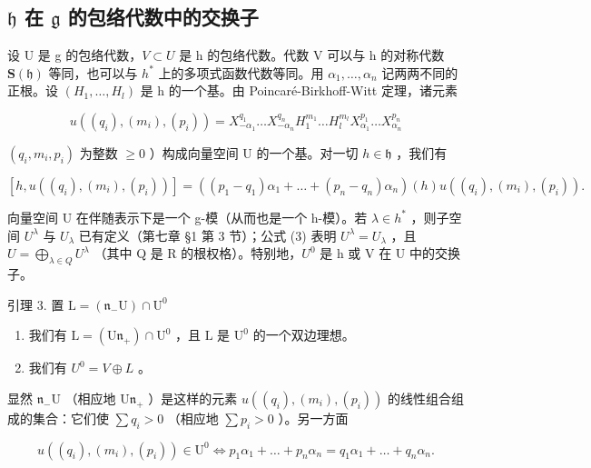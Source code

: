 \subsection{\texorpdfstring{\(\mathfrak{h}\) 在 \(\mathfrak{g}\) 的包络代数中的交换子}{\textbackslash mathfrak\{h\} 在 \textbackslash mathfrak\{g\} 的包络代数中的交换子}}

设 U 是 g 的包络代数，\(V \subset U\) 是 h 的包络代数。代数 V 可以与 h 的对称代数 \(\mathbf{S}(\mathfrak{h})\) 等同，也可以与 \(h^{*}\) 上的多项式函数代数等同。用 \(\alpha_{1},\ldots,\alpha_{n}\) 记两两不同的正根。设 \((H_{1},\ldots,H_{l})\) 是 h 的一个基。由 Poincaré-Birkhoff-Witt 定理，诸元素

\[
u ((q _ {i}), (m _ {i}), (p _ {i})) = X _ {- \alpha_ {1}} ^ {q _ {1}} \dots X _ {- \alpha_ {n}} ^ {q _ {n}} H _ {1} ^ {m _ {1}} \dots H _ {l} ^ {m _ {l}} X _ {\alpha_ {1}} ^ {p _ {1}} \dots X _ {\alpha_ {n}} ^ {p _ {n}}
\]

\((q_{i},m_{i},p_{i})\) 为整数 \(\geq 0\) ）构成向量空间 U 的一个基。对一切 \(h\in \mathfrak{h}\) ，我们有

\[
[ h, u ((q _ {i}), (m _ {i}), (p _ {i})) ] = ((p _ {1} - q _ {1}) \alpha_ {1} + \dots + (p _ {n} - q _ {n}) \alpha_ {n}) (h) u ((q _ {i}), (m _ {i}), (p _ {i})).\tag{3}
\]

向量空间 U 在伴随表示下是一个 g-模（从而也是一个 h-模）。若 \(\lambda \in h^{*}\) ，则子空间 \(U^{\lambda}\) 与 \(U_{\lambda}\) 已有定义（第七章 §1 第 3 节）；公式 (3) 表明 \(U^{\lambda} = U_{\lambda}\) ，且 \(U = \bigoplus_{\lambda \in Q} U^{\lambda}\) （其中 Q 是 R 的根权格）。特别地，\(U^{0}\) 是 h 或 V 在 U 中的交换子。

引理 3. 置 \(\mathrm{L} = (\mathfrak{n}_{-}\mathrm{U})\cap \mathrm{U}^{0}\)

\begin{enumerate}
\def\labelenumi{(\roman{enumi})}
\item
  我们有 \(\mathrm{L} = (\mathrm{U}\mathfrak{n}_{+})\cap \mathrm{U}^{0}\) ，且 \(\mathrm{L}\) 是 \(\mathrm{U}^0\) 的一个双边理想。
\item
  我们有 \(U^{0} = V \oplus L\) 。
\end{enumerate}

显然 \(\mathfrak{n}_{-}\mathrm{U}\) （相应地 \(\mathrm{U}\mathfrak{n}_{+}\) ）是这样的元素 \(u((q_{i}),(m_{i}),(p_{i}))\) 的线性组合组成的集合：它们使 \(\sum q_{i}>0\) （相应地 \(\sum p_{i}>0\) ）。另一方面

\[
u \left(\left(q _ {i}\right), \left(m _ {i}\right), \left(p _ {i}\right)\right) \in \mathrm{U} ^ {0} \Longleftrightarrow p _ {1} \alpha_ {1} + \dots + p _ {n} \alpha_ {n} = q _ {1} \alpha_ {1} + \dots + q _ {n} \alpha_ {n}.
\]

